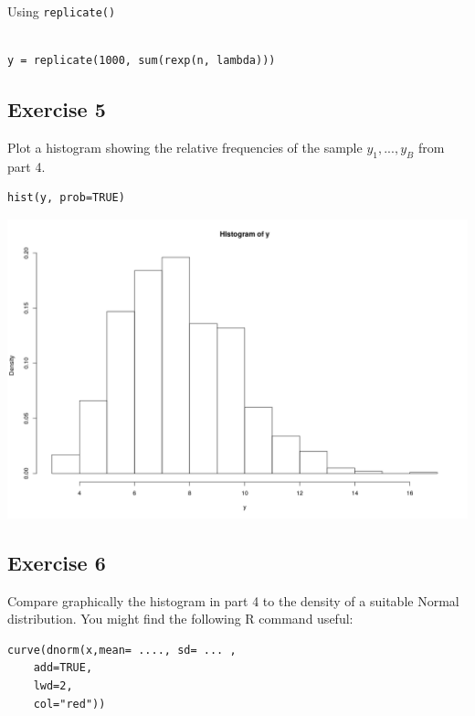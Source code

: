 \documentclass[a4paper,12pt]{article}
\begin{document}
\noindent Using \texttt{replicate()}
\begin{framed}\begin{verbatim}

y = replicate(1000, sum(rexp(n, lambda)))

\end{verbatim}\end{framed}
\newpage 
\subsection*{Exercise  5}

Plot a histogram showing the relative frequencies of the sample $y_1 , ..., y_B$  from
part 4.

\begin{framed}\begin{verbatim}
hist(y, prob=TRUE) 
\end{verbatim}\end{framed}


\includegraphics[scale=0.55]{00-C1/images/00-C1-Q3-Hist.png}
\newpage

\subsection*{Exercise 6}
\noindent Compare graphically the histogram in part 4 to the density of a
suitable Normal distribution. You might find the following R command
useful:

\begin{framed}\begin{verbatim}
curve(dnorm(x,mean= ...., sd= ... , 
    add=TRUE, 
    lwd=2,
    col="red"))
\end{verbatim}\end{framed}
\end{document}
